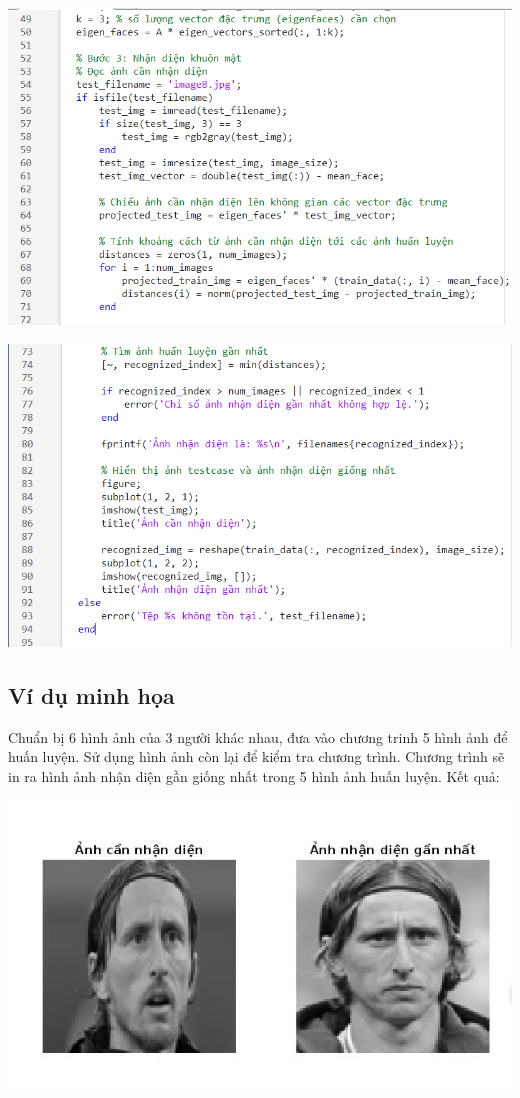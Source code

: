 \documentclass[12pt,a4paper]{article}
\begin{document}
\begin{center}
    \includegraphics[width = 1\textwidth]{10.png}
\end{center}
\begin{center}
    \includegraphics[width = 1\textwidth]{11.png}
\end{center}
\subsection{Ví dụ minh họa}
Chuẩn bị 6 hình ảnh của 3 người khác nhau, đưa vào chương trinh 5 hình ảnh để huấn luyện. Sử dụng hình ảnh còn lại để kiểm tra chương trình. Chương trình sẽ in ra hình ảnh nhận diện gần giống nhất trong 5 hình ảnh huấn luyện. Kết quả:
\begin{center}
    \includegraphics[width = 1\textwidth]{12.png}
\end{center}
\end{document}

